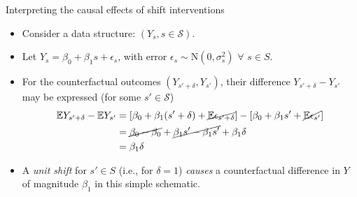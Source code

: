 \documentclass{beamer}
\begin{document}

\begin{frame}[c]{Interpreting the causal effects of shift interventions}

\begin{center}
\begin{itemize}
  \itemsep6pt
  \item Consider a data structure: $(Y_s, s \in \mathcal{S})$.
  \item Let $Y_s = \beta_0 + \beta_1 s + \epsilon_s$, with error $\epsilon_s
    \sim \text{N}(0, \sigma^2_s) \,\, \forall \,\, s \in S$.
  \item For the counterfactual outcomes $(Y_{s' + \delta}, Y_{s'})$, their
    difference $Y_{s' + \delta} - Y_{s'}$ may be expressed (for some
    $s' \in \mathcal{S}$)
    \begin{align*}
      \mathbb{E} Y_{s' + \delta} - \mathbb{E} Y_{s'} &= [\beta_0 + \beta_1 (s' + \delta) +
          \cancel{\mathbb{E} \epsilon_{s' + \delta}}] - [\beta_0 + \beta_1 s' +
          \cancel{\mathbb{E} \epsilon_{s'}}] \\
        &= \cancel{\beta_0 - \beta_0} + \cancel{\beta_1 s' - \beta_1 s'} +
           \beta_1 \delta \\
        &= \beta_1 \delta
    \end{align*}
  \item A \textit{unit shift} for $s' \in S$ (i.e., for $\delta = 1$)
     \textit{causes} a counterfactual difference in $Y$ of magnitude $\beta_1$
     in this simple schematic.
\end{itemize}
\end{center}


\end{frame}

\end{document}
